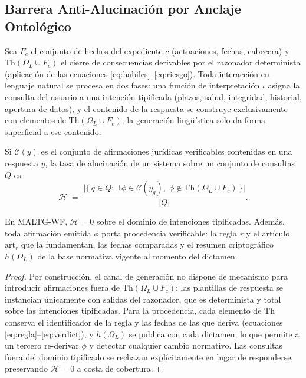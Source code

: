 \documentclass[computers,article,submit,pdftex,moreauthors]{Definitions/mdpi}
\begin{document}
\subsection{Barrera Anti-Alucinación por Anclaje Ontológico}

Sea $F_c$ el conjunto de hechos del expediente $c$ (actuaciones, fechas, cabecera) y $\mathrm{Th}(\Omega_L \cup F_c)$ el cierre de consecuencias derivables por el razonador determinista (aplicación de las ecuaciones \eqref{eq:habiles}--\eqref{eq:riesgo}). Toda interacción en lenguaje natural se procesa en dos fases: una función de interpretación $\iota$ asigna la consulta del usuario a una intención tipificada (plazos, salud, integridad, historial, apertura de datos), y el contenido de la respuesta se construye exclusivamente con elementos de $\mathrm{Th}(\Omega_L \cup F_c)$; la generación lingüística solo da forma superficial a ese contenido.

\begin{Definition}
Si $\mathcal{C}(y)$ es el conjunto de afirmaciones jurídicas verificables contenidas en una respuesta $y$, la tasa de alucinación de un sistema sobre un conjunto de consultas $Q$ es
\begin{equation}
\mathcal{H} \;=\; \frac{\bigl|\{\, q \in Q : \exists\, \phi \in \mathcal{C}(y_q),\; \phi \notin \mathrm{Th}(\Omega_L \cup F_c) \,\}\bigr|}{|Q|}.
\label{eq:hall}
\end{equation}
\end{Definition}

\begin{Proposition}
En MALTG-WF, $\mathcal{H} = 0$ sobre el dominio de intenciones tipificadas. Además, toda afirmación emitida $\phi$ porta procedencia verificable: la regla $r$ y el artículo $\mathrm{art}_r$ que la fundamentan, las fechas comparadas y el resumen criptográfico $h(\Omega_L)$ de la base normativa vigente al momento del dictamen.
\end{Proposition}

\begin{proof}
Por construcción, el canal de generación no dispone de mecanismo para introducir afirmaciones fuera de $\mathrm{Th}(\Omega_L \cup F_c)$: las plantillas de respuesta se instancian únicamente con salidas del razonador, que es determinista y total sobre las intenciones tipificadas. Para la procedencia, cada elemento de $\mathrm{Th}$ conserva el identificador de la regla y las fechas de las que deriva (ecuaciones \eqref{eq:regla}--\eqref{eq:verdict}), y $h(\Omega_L)$ se publica con cada dictamen, lo que permite a un tercero re-derivar $\phi$ y detectar cualquier cambio normativo. Las consultas fuera del dominio tipificado se rechazan explícitamente en lugar de responderse, preservando $\mathcal{H}=0$ a costa de cobertura.
\end{proof}
\end{document}
